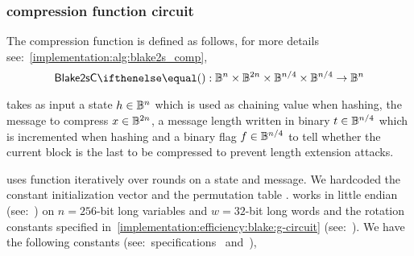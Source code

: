 \subsubsection{ compression function circuit}\label{implementation:efficiency:blake:comp-circuit}

The compression function is defined as follows, for more details see:~\cref{implementation:alg:blake2s_comp},
\[
  \blake{2sC}{} : \BB^n \times \BB^{2n} \times \BB^{n/4} \times \BB^{n/4} \to \BB^n
\]

 takes as input a state $h \in \mathbb{B}^n$ which is used as chaining value when hashing, the message to compress $x \in \mathbb{B}^{2n}$, a message length written in binary $t \in \mathbb{B}^{n/4}$ which is incremented when hashing and a binary flag $f \in \mathbb{B}^{n/4}$ to tell whether the current block is the last to be compressed to prevent length extension attacks.

 uses \blakeG function iteratively over \blakeRound rounds on a state and message. We hardcoded the constant initialization vector \blakeIV{} and the permutation table \blakePermutation{}.  works in little endian (see:~\cite[Section 2.4]{blakecompietf}) on $n=256$-bit long variables and $w=32$-bit long words and the rotation constants specified in~\cref{implementation:efficiency:blake:g-circuit} (see:~\cite[Section 2.1]{blakecompietf}). We have the following constants (see:~specifications~\cite{aumasson2013blake2} and~\cite[Section 2.2]{blakecompietf}),

